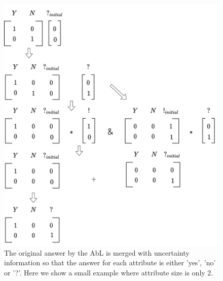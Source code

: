 \documentclass[a4paper,cleardoubleempty,BCOR1cm, 11pt]{report}
\begin{document}
\begin{figure}[t!]
	\centering
	\begin{minipage}{0.45\textwidth}
		\centering
		\includegraphics[width=1\textwidth]{images/extended_vocab.pdf} 
		\caption{The original answer by the AbL is merged with uncertainty information so that the answer for each attribute is either 'yes', 'no' or '?'. Here we show a small example where attribute size is only $2$.}
		\label{fig:extended_vocab}
	\end{minipage}\hfill
	\begin{minipage}{0.45\textwidth}
		\centering

\end{minipage}
\end{figure}
\end{document}
